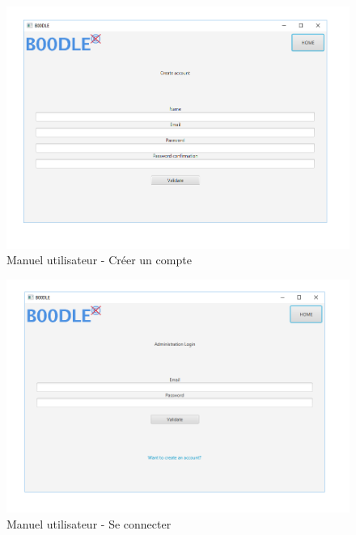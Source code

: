 \documentclass[titlepage]{report}
\begin{document}
\begin{figure}[h]
	\caption{Manuel utilisateur - Créer un compte}
	\label{um_creerCompte}
	\centering
	\includegraphics[width=\textwidth]{figures/CapturesEcrans/createAccount.png}
\end{figure}

\begin{figure}[h]
	\caption{Manuel utilisateur - Se connecter}
	\label{um_connexion}
	\centering
	\includegraphics[width=\textwidth]{figures/CapturesEcrans/login.png}
\end{figure}
\end{document}
